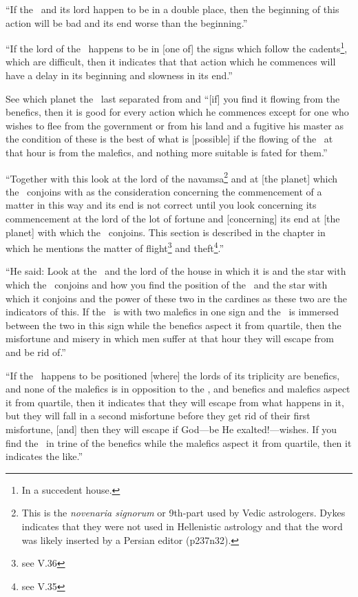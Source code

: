 ``If  the \Moon\, and its lord happen to be in a double place, then the beginning of this action will be bad and its end worse than the beginning.''

``If  the lord of the \Moon\, happens to be in [one of] the signs which follow the cadents\footnote{In a succedent house.}, which are difficult, then it indicates that that action which he commences will have a delay in its beginning and slowness in its end.''

See  which planet the \Moon\, last separated from and ``[if] you find it flowing from the benefics, then it is good for every action which he commences except for one who wishes to flee from the government or from his land and a fugitive his master as the condition of these is the best of what is [possible] if the flowing of the \Moon\, at that hour is from the malefics, and nothing more suitable is fated for them.''

``Together  with this look at the lord of the navamsa\footnote{This is the \textsl{novenaria signorum} or 9th-part used by Vedic astrologers. Dykes indicates that they were not used in Hellenistic astrology and that the word was likely inserted by a Persian editor (p237n32).} and at [the planet] which the \Moon\, conjoins with as the consideration concerning the commencement of a matter in this way and its end is not correct until you look concerning its commencement at the lord of the lot of fortune and [concerning] its end at [the planet] with which the \Moon\, conjoins. This section is described in the chapter in which he mentions the matter of flight\footnote{see V.36} and theft\footnote{see V.35}.''

``He  said: Look at the \Moon\, and the lord of the house in which it is and the star with which the \Moon\, conjoins and how you find the position of the \Moon\, and the star with which it conjoins and the power of these two in the cardines as these two are the indicators of this. If the \Moon\, is with two malefics in one sign and the \Moon\, is immersed between the two in this sign while the benefics aspect it from quartile, then the misfortune and misery in which men suffer at that hour they will escape from and be rid of.''

``If  the \Moon\, happens to be positioned [where] the lords of its triplicity are benefics, and none of the malefics is in opposition to the \Moon, and benefics and malefics aspect it from quartile, then it indicates that they will escape from what happens in it, but they will fall in a second misfortune before they get rid of their first misfortune, [and] then they will escape if God---be He exalted!---wishes. If you find the \Moon\, in trine of the benefics while the malefics aspect it from quartile, then it indicates the like.''

